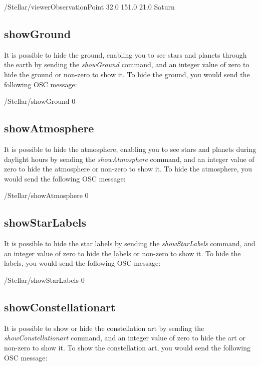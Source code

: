  \begin{syntax}	
 	\medskip
 	/Stellar/viewerObservationPoint 32.0 151.0 21.0 Saturn
 	\medskip
 \end{syntax}
 
 
 \subsection{showGround }
 It is possible to hide the ground, enabling you to see stars and planets through the earth by sending the \textit{showGround } command, and an integer value of zero to hide the ground or non-zero to show it. To hide the ground, you would send the following OSC message:
 
  \begin{syntax}	
 	\medskip
 	/Stellar/showGround 0
 	\medskip
 \end{syntax}

 \subsection{showAtmosphere }
It is possible to hide the atmosphere, enabling you to see stars and planets during daylight hours by sending the \textit{showAtmosphere} command, and an integer value of zero to hide the atmosphere or non-zero to show it. To hide the atmosphere, you would send the following OSC message:

\begin{syntax}	
	\medskip
	/Stellar/showAtmosphere 0
	\medskip
\end{syntax}

 \subsection{showStarLabels }
It is possible to hide the star labels  by sending the \textit{showStarLabels} command, and an integer value of zero to hide the labels or non-zero to show it. To hide the labels, you would send the following OSC message:

\begin{syntax}	
	\medskip
	/Stellar/showStarLabels 0
	\medskip
\end{syntax}

 \subsection{showConstellationart }
It is possible to show or hide the constellation art by sending the \textit{showConstellationart} command, and an integer value of zero to hide the art or non-zero to show it. To show the constellation art, you would send the following OSC message:


